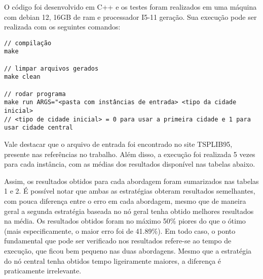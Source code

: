\documentclass[10pt]{extarticle} %
\begin{document}
O código foi desenvolvido em C++ e os testes foram realizados em uma máquina com debian 12, 16GB de ram e processador I5-11 geração. Sua execução pode ser realizada com os seguintes comandos:

\begin{verbatim}
// compilação
make

// limpar arquivos gerados
make clean

// rodar programa
make run ARGS="<pasta com instâncias de entrada> <tipo da cidade inicial>
// <tipo de cidade inicial> = 0 para usar a primeira cidade e 1 para usar cidade central
\end{verbatim}

Vale destacar que o arquivo de entrada foi encontrado no site TSPLIB95, presente nas referências no trabalho. Além disso, a execução foi realizada 5 vezes para cada instância, com as médias dos resultados disponível nas tabelas abaixo.

Assim, os resultados obtidos para cada abordagem foram sumarizados nas tabelas 1 e 2. É possível notar que ambas as estratégias obteram resultados semelhantes, com pouca diferença entre o erro em cada abordagem, mesmo que de maneira geral a segunda estratégia baseada no nó geral tenha obtido melhores resultados na média. Os resultados obtidos foram no máximo 50\% piores do que o ótimo (mais especificamente, o maior erro foi de 41.89\%). Em todo caso, o ponto fundamental que pode ser verificado nos resultados refere-se ao tempo de execução, que ficou bem pequeno nas duas abordagens. Mesmo que a estratégia do nó central tenha obtidos tempo ligeiramente maiores, a diferença é praticamente irrelevante.
\end{document}
